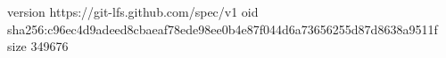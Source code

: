 version https://git-lfs.github.com/spec/v1
oid sha256:c96ec4d9adeed8cbaeaf78ede98ee0b4e87f044d6a73656255d87d8638a9511f
size 349676
